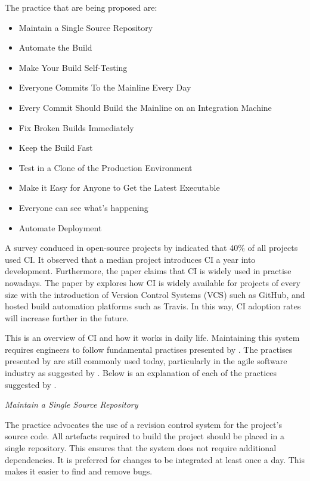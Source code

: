 \documentclass[]{book}
\providecommand{\tightlist}{%
  \setlength{\itemsep}{0pt}\setlength{\parskip}{0pt}}
\begin{document}
The practice that are being proposed are:

\begin{itemize}
\tightlist
\item
  Maintain a Single Source Repository
\item
  Automate the Build
\item
  Make Your Build Self-Testing
\item
  Everyone Commits To the Mainline Every Day
\item
  Every Commit Should Build the Mainline on an Integration Machine
\item
  Fix Broken Builds Immediately
\item
  Keep the Build Fast
\item
  Test in a Clone of the Production Environment
\item
  Make it Easy for Anyone to Get the Latest Executable
\item
  Everyone can see what's happening
\item
  Automate Deployment
\end{itemize}

A survey conduced in open-source projects by \citet{hilton2016usage}
indicated that 40\% of all projects used CI. It observed that a median
project introduces CI a year into development. Furthermore, the paper
claims that CI is widely used in practise nowadays. The paper by
\citet{rausch2017empirical} explores how CI is widely available for
projects of every size with the introduction of Version Control Systems
(VCS) such as GitHub, and hosted build automation platforms such as
Travis. In this way, CI adoption rates will increase further in the
future.

This is an overview of CI and how it works in daily life. Maintaining
this system requires engineers to follow fundamental practises presented
by \citet{fowler2006continuous}. The practises presented by
\citet{fowler2006continuous} are still commonly used today, particularly
in the agile software industry as suggested by
\citet{stolberg2009enabling}. Below is an explanation of each of the
practices suggested by \citet{fowler2006continuous}.

\emph{Maintain a Single Source Repository}

The practice advocates the use of a revision control system for the
project's source code. All artefacts required to build the project
should be placed in a single repository. This ensures that the system
does not require additional dependencies. It is preferred for changes to
be integrated at least once a day. This makes it easier to find and
remove bugs.
\end{document}

